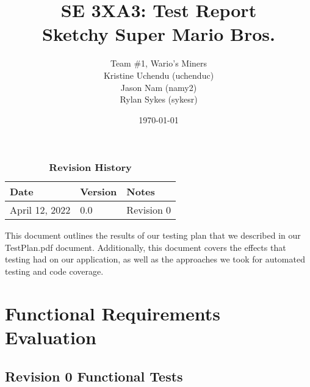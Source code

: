 \documentclass[12pt, titlepage]{article}
\title{SE 3XA3: Test Report\\Sketchy Super Mario Bros.}
\author{Team \#1, Wario's Miners
		\\ Kristine Uchendu (uchenduc)
		\\ Jason Nam (namy2)
		\\ Rylan Sykes (sykesr)
}
\date{\today}
\begin{document}
\maketitle

\tableofcontents
\listoftables
\listoffigures

\begin{table}[bp]
\caption{\bf Revision History}
\begin{tabularx}{\textwidth}{p{3cm}p{2cm}X}
\toprule {\bf Date} & {\bf Version} & {\bf Notes}\\
\midrule
April 12, 2022 & 0.0 & Revision 0\\
\bottomrule
\end{tabularx}
\end{table}

\newpage


This document outlines the results of our testing plan that we described in our TestPlan.pdf document. Additionally, this document covers the effects that testing had on our application, as well as the approaches we took for automated testing and code coverage.

\section{Functional Requirements Evaluation}

\subsection{Revision 0 Functional Tests}
\end{document}
